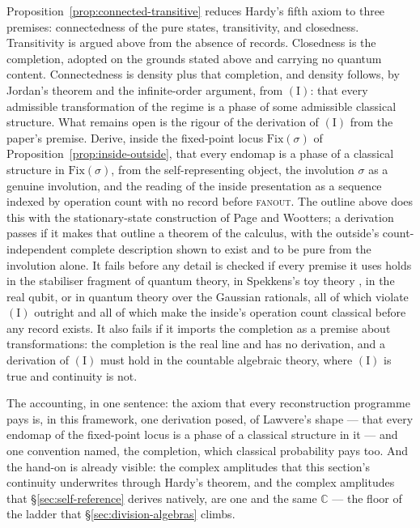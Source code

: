 \begin{openproblem}\label{op:limit-realisability}
Proposition~\ref{prop:connected-transitive} reduces Hardy's fifth axiom to three premises:
connectedness of the pure states, transitivity, and closedness. Transitivity is argued above
from the absence of records. Closedness is the completion, adopted on the grounds stated above
and carrying no quantum content. Connectedness is density plus that completion, and density
follows, by Jordan's theorem and the infinite-order argument, from $(\mathrm{I})$: that every
admissible transformation of the regime is a phase of some admissible classical structure. What
remains open is the rigour of the derivation of $(\mathrm{I})$ from the paper's premise. Derive,
inside the fixed-point locus $\mathrm{Fix}(\sigma)$ of Proposition~\ref{prop:inside-outside},
that every endomap is a phase of a classical structure in $\mathrm{Fix}(\sigma)$, from the
self-representing object, the involution $\sigma$ as a genuine involution, and the reading of
the inside presentation as a sequence indexed by operation count with no record before
\textsc{fanout}. The outline above does this with the stationary-state construction of Page and
Wootters; a derivation passes if it makes that outline a theorem of the calculus, with the
outside's count-independent complete description shown to exist and to be pure from the
involution alone. It fails before any detail is checked if every premise it uses holds in the
stabiliser fragment of quantum theory, in Spekkens's toy theory \autocite{spekkens2007toy}, in
the real qubit, or in quantum theory over the Gaussian rationals, all of which violate
$(\mathrm{I})$ outright and all of which make the inside's operation count classical before any
record exists. It also fails if it imports the completion as a premise about transformations:
the completion is the real line and has no derivation, and a derivation of $(\mathrm{I})$ must
hold in the countable algebraic theory, where $(\mathrm{I})$ is true and continuity is not.
\end{openproblem}

The accounting, in one sentence: the axiom that every reconstruction programme pays is, in this
framework, one derivation posed, of Lawvere's shape --- that every endomap of the fixed-point
locus is a phase of a classical structure in it --- and one convention named, the completion,
which classical probability pays too. And
the hand-on is already visible: the complex amplitudes that this section's continuity underwrites
through Hardy's theorem, and the complex amplitudes that \S\ref{sec:self-reference} derives natively,
are one and the same $\mathbb{C}$ --- the floor of the ladder that \S\ref{sec:division-algebras}
climbs.
